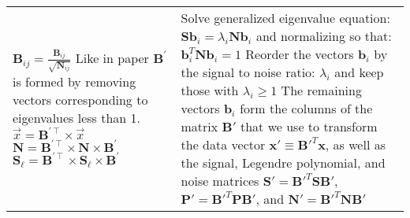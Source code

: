 \documentclass{article}
\newcommand{\TRANSPOSE}[0] {\intercal}
\begin{document}
\begin{spacing}{2}
\begin{longtable}{@{\extracolsep{\fill}}p{}
                                         p{}@{}}
$\mathbf{B}_{ij}=\frac{\mathbf{B}_{ij}}{\sqrt{\mathbf{N}_{ij}}}$ \newline
Like in paper $\mathbf{B}^{\prime}$ is formed by removing vectors corresponding to eigenvalues less than 1. \newline
$\vec{x}=\mathbf{B}^{\prime\TRANSPOSE}\times \vec{x}$ \newline
$\mathbf{N}=\mathbf{B}^{\prime\TRANSPOSE}\times\mathbf{N}\times\mathbf{B}^{\prime}$ \newline
$\mathbf{S_\ell}=\mathbf{B}^{\prime\TRANSPOSE}\times\mathbf{S_\ell}\times\mathbf{B}^{\prime}$ \newline
 
& %
Solve generalized eigenvalue equation: \newline
$\mathbf{Sb}_{i} = \lambda_{i} \mathbf{Nb}_i$ \newline
and normalizing so that: \newline
$\mathbf{b}^{T}_{i} \mathbf{Nb}_{i} = 1$ \newline
Reorder the vectors $\mathbf{b}_{i}$ by the signal to noise ratio: $\lambda_{i}$ and keep those with $\lambda_{i} \ge 1$ \newline
The remaining vectors $\mathbf{b}_{i}$ form the columns of the matrix $\mathbf{B}'$ that we use to transform the data vector $\mathbf{x}' \equiv \mathbf{B}'^{T} \mathbf{x}$, 
as well as the signal, Legendre polynomial, and noise matrices $\mathbf{S}' = \mathbf{B}'^{T} \mathbf{SB}'$, 
$\mathbf{P}' = \mathbf{B}'^{T} \mathbf{PB}'$, and $\mathbf{N}' = \mathbf{B}'^{T} \mathbf{NB}'$

\\ %



\end{longtable}
\end{spacing}
\end{document}
